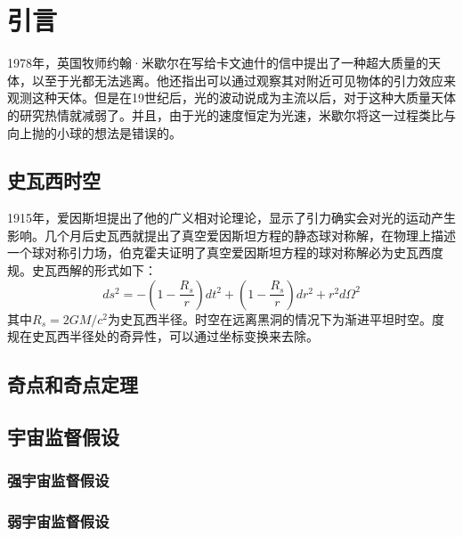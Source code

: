 \chapter{引言}
1978年，英国牧师约翰·米歇尔在写给卡文迪什的信中提出了一种超大质量的天体，以至于光都无法逃离\citep{michell1784vii}。他还指出可以通过观察其对附近可见物体的引力效应来观测这种天体。但是在19世纪后，光的波动说成为主流以后，对于这种大质量天体的研究热情就减弱了。并且，由于光的速度恒定为光速，米歇尔将这一过程类比与向上抛的小球的想法是错误的。
\section{史瓦西时空}
1915年，爱因斯坦提出了他的广义相对论理论，显示了引力确实会对光的运动产生影响。几个月后史瓦西就提出了真空爱因斯坦方程的静态球对称解\citep{schwarzschild1916gravitationsfeld}，在物理上描述一个球对称引力场，伯克霍夫证明了真空爱因斯坦方程的球对称解必为史瓦西度规\citep{birkhoff1923relativity}。史瓦西解的形式如下：
\begin{equation}
    ds^2=-\left(1-\frac{R_s}{r}\right)dt^2+\left(1-\frac{R_s}{r}\right)dr^2+r^2d\Omega^2
\end{equation}
其中$R_s=2GM/c^2$为史瓦西半径。时空在远离黑洞的情况下为渐进平坦时空。度规在史瓦西半径处的奇异性，可以通过坐标变换来去除。

\section{奇点和奇点定理}
\section{宇宙监督假设}
\subsection{强宇宙监督假设}
\subsection{弱宇宙监督假设}

